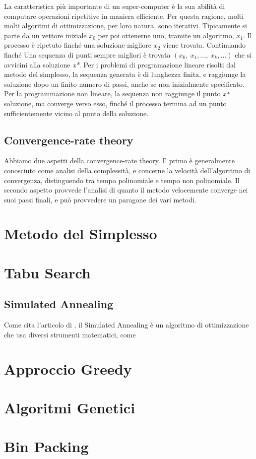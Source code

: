\documentclass{article}
\begin{document}
La caratteristica più importante di un super-computer è la sua abilità di
computare operazioni ripetitive in maniera efficiente. Per questa ragione,
molti molti algoritmi di ottimizzazione, per loro natura, sono iterativi.
Tipicamente si parte da un vettore iniziale \(x_0\) per poi ottenerne uno, tramite un algoritmo, \(x_1\).
Il processo è ripetuto finché una soluzione migliore \(x_2\) viene trovata. Continuando finché 
Una sequenza di punti sempre migliori è trovata \( (x_0 , \ x_1 , ..., \ x_k , ...  )\) che si avvicini 
alla soluzione \textit{x*}. Per i problemi di programazione lineare risolti dal metodo del simplesso,
la sequenza generata è di lunghezza finita, e raggiunge la soluzione dopo un finito
numero di passi, anche se non inizialmente specificato.
Per la programmazione non lineare, la sequenza non raggiunge il punto \textit{x*} soluzione, 
ma converge verso esso, finché il processo termina ad un punto sufficientemente vicino al 
punto della soluzione.

\subsection{Convergence-rate theory}
Abbiamo due aspetti della convergence-rate theory. Il primo è generalmente 
conosciuto come analisi della complessità, e concerne la velocità dell'algoritmo 
di convergenza, distinguendo tra tempo polinomiale e tempo non polinomiale.
Il secondo aspetto provvede l'analisi di quanto il metodo velocemente converge 
nei suoi passi finali, e può provvedere un paragone dei vari metodi.

\section{Metodo del Simplesso}


\section{Tabu Search}

\subsection{Simulated Annealing}

Come cita l'articolo di  \textcite{SimulatedAnnealing01}, il Simulated Annealing
è un algoritmo di ottimizzazione che usa diversi strumenti matematici, come  

\section{Approccio Greedy}

\section{Algoritmi Genetici}

\section{Bin Packing}

\printbibliography[title = {Bibliografia e crediti}]
\end{document}
